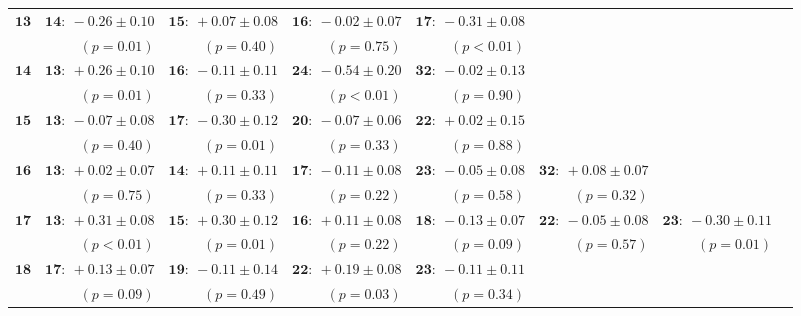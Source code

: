 \begin{landscape}
    \begin{table}[p]
        \footnotesize
        \begin{tabular}{r|rrrrrrr}
            \hline
\( \mathbf{13} \) \vspace{-0.7ex} & \( \mathbf{14:}~-0.26 \pm 0.10 \)& \( \mathbf{15:}~+0.07 \pm 0.08 \)& \( \mathbf{16:}~-0.02 \pm 0.07 \)& \( \mathbf{17:}~-0.31 \pm 0.08 \)\\ 
 & \( (p={0.01}) \)& \( (p={0.40}) \)& \( (p={0.75}) \)& \( (p<0.01) \)\\ 
\( \mathbf{14} \) \vspace{-0.7ex} & \( \mathbf{13:}~+0.26 \pm 0.10 \)& \( \mathbf{16:}~-0.11 \pm 0.11 \)& \( \mathbf{24:}~-0.54 \pm 0.20 \)& \( \mathbf{32:}~-0.02 \pm 0.13 \)\\ 
 & \( (p={0.01}) \)& \( (p={0.33}) \)& \( (p<0.01) \)& \( (p={0.90}) \)\\ 
\( \mathbf{15} \) \vspace{-0.7ex} & \( \mathbf{13:}~-0.07 \pm 0.08 \)& \( \mathbf{17:}~-0.30 \pm 0.12 \)& \( \mathbf{20:}~-0.07 \pm 0.06 \)& \( \mathbf{22:}~+0.02 \pm 0.15 \)\\ 
 & \( (p={0.40}) \)& \( (p={0.01}) \)& \( (p={0.33}) \)& \( (p={0.88}) \)\\ 
\( \mathbf{16} \) \vspace{-0.7ex} & \( \mathbf{13:}~+0.02 \pm 0.07 \)& \( \mathbf{14:}~+0.11 \pm 0.11 \)& \( \mathbf{17:}~-0.11 \pm 0.08 \)& \( \mathbf{23:}~-0.05 \pm 0.08 \)& \( \mathbf{32:}~+0.08 \pm 0.07 \)\\ 
 & \( (p={0.75}) \)& \( (p={0.33}) \)& \( (p={0.22}) \)& \( (p={0.58}) \)& \( (p={0.32}) \)\\ 
\( \mathbf{17} \) \vspace{-0.7ex} & \( \mathbf{13:}~+0.31 \pm 0.08 \)& \( \mathbf{15:}~+0.30 \pm 0.12 \)& \( \mathbf{16:}~+0.11 \pm 0.08 \)& \( \mathbf{18:}~-0.13 \pm 0.07 \)& \( \mathbf{22:}~-0.05 \pm 0.08 \)& \( \mathbf{23:}~-0.30 \pm 0.11 \)\\ 
 & \( (p<0.01) \)& \( (p={0.01}) \)& \( (p={0.22}) \)& \( (p={0.09}) \)& \( (p={0.57}) \)& \( (p={0.01}) \)\\ 
\( \mathbf{18} \) \vspace{-0.7ex} & \( \mathbf{17:}~+0.13 \pm 0.07 \)& \( \mathbf{19:}~-0.11 \pm 0.14 \)& \( \mathbf{22:}~+0.19 \pm 0.08 \)& \( \mathbf{23:}~-0.11 \pm 0.11 \)\\ 
 & \( (p={0.09}) \)& \( (p={0.49}) \)& \( (p={0.03}) \)& \( (p={0.34}) \)\\ 

\end{tabular}
\end{table}
\end{landscape}
